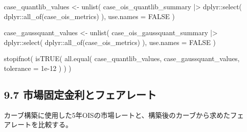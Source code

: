 \documentclass[
  letterpaper,
  DIV=11,
  numbers=noendperiod]{scrreprt}
\newenvironment{Shaded}{\begin{snugshade}}{\end{snugshade}}
\newcommand{\AttributeTok}[1]{\textcolor[rgb]{0.40,0.45,0.13}{#1}}
\newcommand{\ConstantTok}[1]{\textcolor[rgb]{0.56,0.35,0.01}{#1}}
\newcommand{\FloatTok}[1]{\textcolor[rgb]{0.68,0.00,0.00}{#1}}
\newcommand{\FunctionTok}[1]{\textcolor[rgb]{0.28,0.35,0.67}{#1}}
\newcommand{\NormalTok}[1]{\textcolor[rgb]{0.00,0.23,0.31}{#1}}
\newcommand{\OtherTok}[1]{\textcolor[rgb]{0.00,0.23,0.31}{#1}}
\newcommand{\SpecialCharTok}[1]{\textcolor[rgb]{0.37,0.37,0.37}{#1}}
\begin{document}
\begin{Shaded}
\begin{Highlighting}[]
\NormalTok{case\_quantlib\_values }\OtherTok{\textless{}{-}} \FunctionTok{unlist}\NormalTok{(}
\NormalTok{  case\_ois\_quantlib\_summary }\SpecialCharTok{|\textgreater{}}
\NormalTok{    dplyr}\SpecialCharTok{::}\FunctionTok{select}\NormalTok{(}
\NormalTok{      dplyr}\SpecialCharTok{::}\FunctionTok{all\_of}\NormalTok{(case\_ois\_metrics)}
\NormalTok{    ),}
  \AttributeTok{use.names =} \ConstantTok{FALSE}
\NormalTok{)}

\NormalTok{case\_gaussquant\_values }\OtherTok{\textless{}{-}} \FunctionTok{unlist}\NormalTok{(}
\NormalTok{  case\_ois\_gaussquant\_summary }\SpecialCharTok{|\textgreater{}}
\NormalTok{    dplyr}\SpecialCharTok{::}\FunctionTok{select}\NormalTok{(}
\NormalTok{      dplyr}\SpecialCharTok{::}\FunctionTok{all\_of}\NormalTok{(case\_ois\_metrics)}
\NormalTok{    ),}
  \AttributeTok{use.names =} \ConstantTok{FALSE}
\NormalTok{)}

\FunctionTok{stopifnot}\NormalTok{(}
  \FunctionTok{isTRUE}\NormalTok{(}
    \FunctionTok{all.equal}\NormalTok{(}
\NormalTok{      case\_quantlib\_values,}
\NormalTok{      case\_gaussquant\_values,}
      \AttributeTok{tolerance =} \FloatTok{1e{-}12}
\NormalTok{    )}
\NormalTok{  )}
\NormalTok{)}
\end{Highlighting}
\end{Shaded}

\subsection{9.7
市場固定金利とフェアレート}\label{ux5e02ux5834ux56faux5b9aux91d1ux5229ux3068ux30d5ux30a7ux30a2ux30ecux30fcux30c8}

カーブ構築に使用した5年OISの市場レートと、構築後のカーブから求めたフェアレートを比較する。
\end{document}
